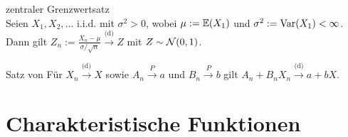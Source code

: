 \begin{Def}{zentraler Grenzwertsatz}\\
    Seien $X_1, X_2, \dotsc$ i.i.d. mit $\sigma^2 > 0$,
    wobei $\mu := \mathbb{E}(X_1)$ und $\sigma^2 := \mathrm{Var}(X_1) < \infty$.\\
    Dann gilt $Z_n := \frac{\overline{X}_n - \mu}{\sigma/\sqrt{n}}
    \xrightarrow{\text{(d)}} Z$ mit $Z \sim \mathcal{N}(0, 1)$.
\end{Def}

\begin{Def}{Satz von }
    Für $X_n \xrightarrow{\text{(d)}} X$ sowie $A_n \xrightarrow{P} a$ und
    $B_n \xrightarrow{P} b$ gilt $A_n + B_n X_n \xrightarrow{\text{(d)}} a + bX$.
\end{Def}

\section{%
    Charakteristische Funktionen%
}

